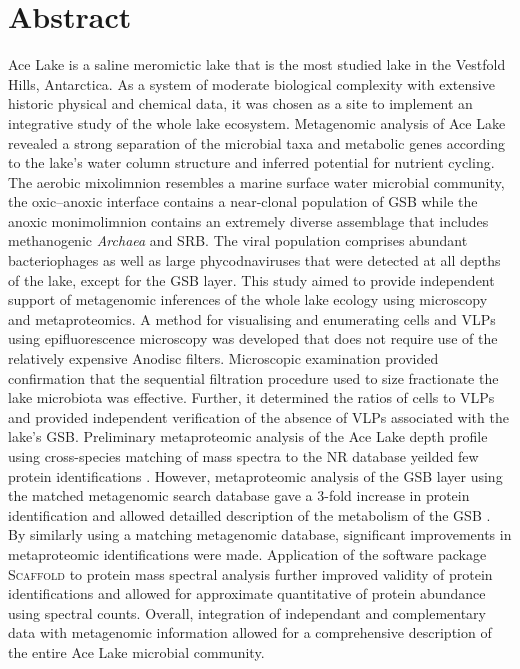 \section{Abstract}
Ace Lake is a saline meromictic lake that is the most studied lake in the Vestfold Hills, Antarctica.
As a system of moderate biological complexity with extensive historic physical and chemical data, it was chosen as a site to implement an integrative study of the whole lake ecosystem.
Metagenomic analysis of Ace Lake revealed a strong separation of the microbial taxa and metabolic genes according to the lake's water column structure and inferred potential for nutrient cycling.
The aerobic mixolimnion resembles a marine surface water microbial community, the oxic--anoxic interface contains a near-clonal population of \ac{GSB} while the anoxic monimolimnion contains an extremely diverse assemblage that includes methanogenic \emph{Archaea} and \ac{SRB}.
The viral population comprises abundant bacteriophages as well as large phycodnaviruses that were detected at all depths of the lake, except for the \ac{GSB} layer.
This study aimed to provide independent support of metagenomic inferences of the whole lake ecology using microscopy and metaproteomics.
A method for visualising and enumerating cells and \acp{VLP} using epifluorescence microscopy was developed that does not require use of the relatively expensive Anodisc filters.
Microscopic examination provided confirmation that the sequential filtration procedure used to size fractionate the lake microbiota was effective. 
Further, it determined the ratios of cells to \acp{VLP} and provided independent verification of the absence of \acp{VLP} associated with the lake's \ac{GSB}.
Preliminary metaproteomic analysis of the Ace Lake depth profile using cross-species matching of mass spectra to the \ac{NR} database yeilded few protein identifications \cite{Ng2010b}.
However, metaproteomic analysis of the \ac{GSB} layer using the matched metagenomic search database gave a 3-fold increase in protein identification and allowed detailled description of the metabolism of the \ac{GSB} \cite{Ng2010a,Ng2010b}.
By similarly using a matching metagenomic database, significant improvements in metaproteomic identifications were made.
Application of the software package \textsc{Scaffold} to protein mass spectral analysis further improved validity of protein identifications and allowed for approximate quantitative of protein abundance using spectral counts.
Overall, integration of independant and complementary data with metagenomic information allowed for a comprehensive description of the entire Ace Lake microbial community. 



